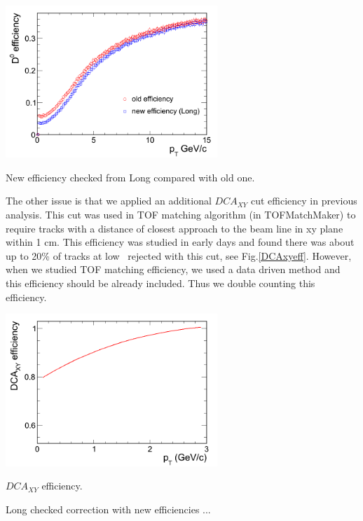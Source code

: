 \bfg \centering
\includegraphics[width=0.6\textwidth]{figure/Run11_YF/eff.png}
\caption{New efficiency checked from Long compared with old one.}
\label{effnew}
\efg

The other issue is that we applied an additional $DCA_{XY}$ cut efficiency in previous analysis. This cut was used in TOF matching algorithm (in TOFMatchMaker) to require tracks with a distance of closest approach to the beam line in xy plane within 1 cm. This efficiency was studied in early days and found there was about up to 20\% of tracks at low \pt\ rejected with this cut, see Fig.\ref{DCAxyeff}. However, when we studied TOF matching efficiency, we used a data driven method and this efficiency should be already included. Thus we double counting this efficiency.

\bfg \centering
\includegraphics[width=0.6\textwidth]{figure/Run11_YF/DCAxyEff.png}
\caption{$DCA_{XY}$ efficiency.}
\label{DCAxyeff}
\efg

Long checked correction with new efficiencies ...



